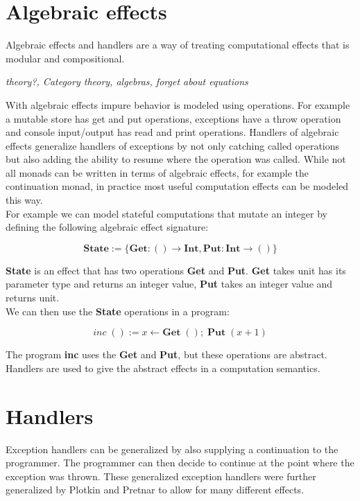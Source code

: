 \section{Algebraic effects}

Algebraic effects and handlers are a way of treating computational effects that is modular and compositional.

\textit{
theory?,
Category theory, algebras,
forget about equations
}

With algebraic effects impure behavior is modeled using operations.
For example a mutable store has get and put operations, exceptions have a throw operation and console input/output has read and print operations.
Handlers of algebraic effects generalize handlers of exceptions by not only catching called operations but also adding the ability to resume where the operation was called.
While not all monads can be written in terms of algebraic effects, for example the continuation monad, in practice most useful computation effects can be modeled this way.
\\
For example we can model stateful computations that mutate an integer by defining the following algebraic effect signature:

\[ \textbf{State} := \{ \textbf{Get} : () \rightarrow \textbf{Int}, \textbf{Put} : \textbf{Int} \rightarrow () \} \]

\textbf{State} is an effect that has two operations \textbf{Get} and \textbf{Put}. \textbf{Get} takes unit has its parameter type and returns an integer value, \textbf{Put} takes an integer value and returns unit.
\\
We can then use the \textbf{State} operations in a program:

\[ \textit{inc} \; () := x \leftarrow \textbf{Get} \; () ;\; \textbf{Put} \; (x + 1) \]

The program \textbf{inc} uses the \textbf{Get} and \textbf{Put}, but these operations are abstract.
Handlers are used to give the abstract effects in a computation semantics.

\section{Handlers}

Exception handlers can be generalized by also supplying a continuation to the programmer.
The programmer can then decide to continue at the point where the exception was thrown.
These generalized exception handlers were further generalized by Plotkin and Pretnar to allow for many different effects.

